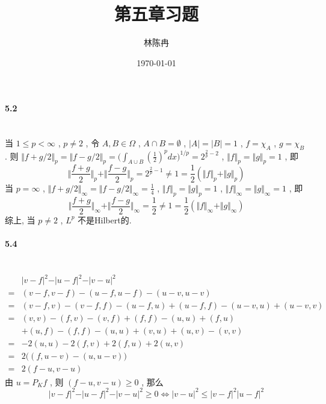 \documentclass[a4paper, UTF8]{ctexart}				%
\title{第五章习题}
\author{林陈冉}
\date{\today}
\numberwithin{equation}{section}				%
\begin{document}
	\maketitle										%
	\paragraph{5.2}\quad\\
	\indent 当 $1 \le p < \infty$ , $p \neq 2$ , 令 $A, B \in \Omega$ , $A \cap B = \emptyset$ , $\vert{A}\vert = \vert{B}\vert = 1$ , $f = \chi_A$ , $g = \chi_B$ . 则 $\Vert{f + g / 2}\Vert_p = \Vert{f - g / 2}\Vert_p = \Big( \int^{ }_{A \cup B} (\frac{1}{2})^p dx \Big)^{1/p} = 2^{\frac{2}{p} - 2}$ , $\Vert{f}\Vert_p = \Vert{g}\Vert_p = 1$ , 即
	\[
		\Vert{\frac{f + g}{2}}\Vert_p + \Vert{\frac{f - g}{2}}\Vert_p  = 2^{\frac{2}{p} - 1} \neq 1 = \frac{1}{2} (\Vert{f}\Vert_p + \Vert{g}\Vert_p)
	\]    
	当 $p = \infty$ , $\Vert{f + g / 2}\Vert_\infty = \Vert{f - g / 2}\Vert_\infty = \frac{1}{4}$ , $\Vert{f}\Vert_p = \Vert{g}\Vert_p = 1$ , $\Vert{f}\Vert_\infty = \Vert{g}\Vert_\infty = 1$ , 即 
	\[
		\Vert{\frac{f + g}{2}}\Vert_\infty + \Vert{\frac{f - g}{2}}\Vert_\infty  = \frac{1}{2} \neq 1 = \frac{1}{2} (\Vert{f}\Vert_\infty + \Vert{g}\Vert_\infty)
	\]   
	综上, 当 $p \neq 2$ , $L^p$ 不是Hilbert的.\\ 

	\paragraph{5.4}\, 
	\begin{equation*}
		\begin{split}
				& \vert{v - f}\vert^2 - \vert{u - f }\vert^2 - \vert{v - u}\vert^2\\
			=   & ({v - f},{v - f}) - ({u - f},{u - f}) - ({u - v},{u - v})\\
			=   & ({v - f},{v}) - ({v - f},{f}) - ({u - f},{u}) + ({u - f},{f}) - ({u - v},{u}) + ({u - v},{v})\\
			=   & ({v},{v}) - ({f},{v}) - ({v},{f}) + ({f},{f}) -({u},{u}) + ({f},{u})\\
				& + ({u},{f}) - ({f},{f}) - ({u},{u}) + ({v},{u}) + ({u},{v}) - ({v},{v})\\
			=   & -2 ({u},{u}) - 2 ({f},{v}) + 2 ({f},{u}) + 2 ({u},{v})\\
			=   & 2\Big( ({f},{u - v}) - ({u},{u - v}) \Big)\\
			=   & 2 ({f -u},{v - u})
		\end{split}
	\end{equation*}
	由 $u = P_K f$ , 则 $({f -u},{v - u}) \ge 0$ , 那么
	\[
		\vert{v - f}\vert^2 - \vert{u - f }\vert^2 - \vert{v - u}\vert^2 \ge 0 \Leftrightarrow \vert{v - u}\vert^2 \le \vert{v - f}\vert^2 \vert{u - f }\vert^2
	\]
	
\end{document}

